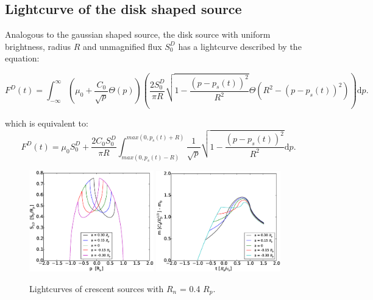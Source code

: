 \subsection{Lightcurve of the disk shaped source}

Analogous to the gaussian shaped source, the disk source with uniform brightness, radius $R$ and unmagnified flux $S_0^D$ has a lightcurve described by the equation:

\begin{equation}
 F^D(t) = \int_{-\infty}^\infty  \left( \mu_0 + \frac{C_0}{\sqrt{p}} \Theta \left( p \right) \right) \left( \frac{2 S_0^D}{ \pi R} \sqrt{1 - \frac{\left( p-p_s(t) \right)^2}{R^2}} \Theta \left(R^2 - \left(p-p_s(t) \right)^2 \right) \right) \mathrm{d}p.
\end{equation}

which is equivalent to:
\begin{equation}
 F^D(t) = \mu_0 S_0^D + \frac{2 C_0 S_0^D}{\pi R} \int_{max(0, p_s(t) - R)}^{max(0, p_s(t) + R)} \frac{1}{\sqrt{p}} \sqrt{1 - \frac{\left( p-p_s(t) \right)^2}{R^2}} \mathrm{d}p.
\end{equation}

\begin{figure}
\centering
	\includegraphics[width = 0.48\textwidth]{plots/S1D_var_a.eps}
	\includegraphics[width = 0.48\textwidth]{plots/4avar_magnification.eps}
\caption{\label{fig:lightcurve_disk} Lightcurves of crescent sources with $R_n$ = 0.4 $R_p$.}
\end{figure}


